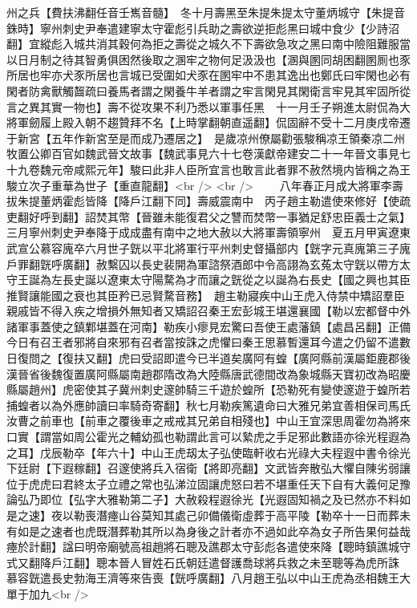 州之兵【費扶沸翻任音壬嶲音髓】　冬十月壽黑至朱提朱提太守董炳城守【朱提音銖時】寧州刺史尹奉遣建寧太守霍彪引兵助之壽欲逆拒彪黑曰城中食少【少詩沼翻】宜縱彪入城共消其穀何為拒之壽從之城久不下壽欲急攻之黑曰南中險阻難服當以日月制之待其智勇俱困然後取之溷牢之物何足汲汲也【溷與圂同胡困翻圂厠也豕所居也牢亦犬豕所居也言城已受圍如犬豕在圂牢中不患其逸出也鄭氏曰牢閑也必有閑者防禽獸觸齧疏曰養馬者謂之閑養牛羊者謂之牢言閑見其閑衛言牢見其牢固所從言之異其實一物也】壽不從攻果不利乃悉以軍事任黑　十一月壬子朔進太尉侃為大將軍劒履上殿入朝不趨贊拜不名【上時掌翻朝直遥翻】侃固辭不受十二月庚戌帝遷于新宮【五年作新宮至是而成乃遷居之】　是歲凉州僚屬勸張駿稱凉王領秦凉二州牧置公卿百官如魏武晉文故事【魏武事見六十七卷漢獻帝建安二十一年晉文事見七十九卷魏元帝咸熙元年】駿曰此非人臣所宜言也敢言此者罪不赦然境内皆稱之為王駿立次子重華為世子【重直龍翻】<br />
<br />
　　八年春正月成大將軍李壽拔朱提董炳霍彪皆降【降戶江翻下同】壽威震南中　丙子趙主勒遣使來修好【使疏吏翻好呼到翻】詔焚其幣【晉雖未能復君父之讐而焚幣一事猶足舒忠臣義士之氣】　三月寧州刺史尹奉降于成成盡有南中之地大赦以大將軍壽領寧州　夏五月甲寅遼東武宣公慕容廆卒六月世子皝以平北將軍行平州刺史督攝部内【皝字元真廆第三子廆戶罪翻皝呼廣翻】赦繫囚以長史裴開為軍諮祭酒郎中令高詡為玄菟太守皝以帶方太守王誕為左長史誕以遼東太守陽騖為才而讓之皝從之以誕為右長史【國之興也其臣推賢讓能國之衰也其臣矜已忌賢騖音務】　趙主勒寢疾中山王虎入侍禁中矯詔羣臣親戚皆不得入疾之增損外無知者又矯詔召秦王宏彭城王堪還襄國【勒以宏都督中外諸軍事蓋使之鎮鄴堪蓋在河南】勒疾小瘳見宏驚曰吾使王處藩鎮【處昌呂翻】正備今日有召王者邪將自來邪有召者當按誅之虎懼曰秦王思慕暫還耳今遣之仍留不遣數日復問之【復扶又翻】虎曰受詔即遣今已半道矣廣阿有蝗【廣阿縣前漢屬鉅鹿郡後漢晉省後魏復置廣阿縣屬南趙郡隋改為大陸縣唐武德間改為象城縣天寶初改為昭慶縣屬趙州】虎密使其子冀州刺史邃帥騎三千遊於蝗所【恐勒死有變使邃遊于蝗所若捕蝗者以為外應帥讀曰率騎奇寄翻】秋七月勒疾篤遺命曰大雅兄弟宜善相保司馬氏汝曹之前車也【前車之覆後車之戒戒其兄弟自相殘也】中山王宜深思周霍勿為將來口實【謂當如周公霍光之輔幼孤也勒謂此言可以縶虎之手足邪此數語亦徐光程遐為之耳】戊辰勒卒【年六十】中山王虎刼太子弘使臨軒收右光祿大夫程遐中書令徐光下廷尉【下遐稼翻】召邃使將兵入宿衛【將即亮翻】文武皆奔散弘大懼自陳劣弱讓位于虎虎曰君終太子立禮之常也弘涕泣固讓虎怒曰若不堪重任天下自有大義何足豫論弘乃即位【弘字大雅勒第二子】大赦殺程遐徐光【光遐固知禍之及已然亦不料如是之速】夜以勒喪潛瘞山谷莫知其處己卯備儀衛虛葬于高平陵【勒卒十一日而葬未有如是之速者也虎既潛葬勒其所以為身後之計者亦不過如此卒為女子所告果何益哉瘞於計翻】諡曰明帝廟號高祖趙將石聰及譙郡太守彭彪各遣使來降【聰時鎮譙城守式又翻降戶江翻】聰本晉人冒姓石氏朝廷遣督護喬球將兵救之未至聰等為虎所誅　慕容皝遣長史勃海王濟等來告喪【皝呼廣翻】八月趙王弘以中山王虎為丞相魏王大單于加九<br />
